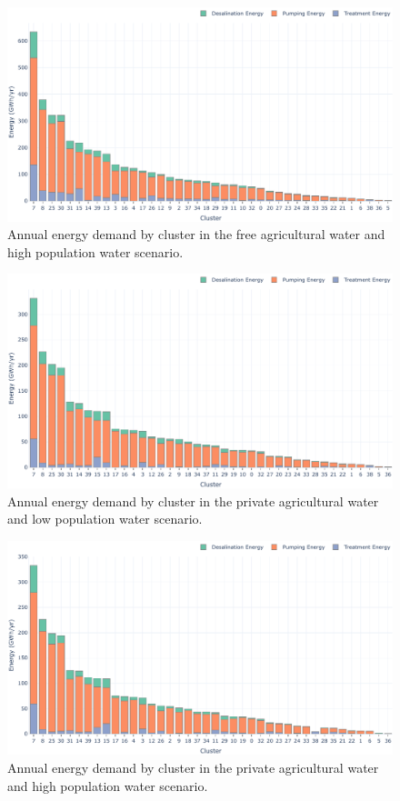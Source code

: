 \documentclass[12pt]{iopart}
\begin{document}
\begin{figure}[!h]
	\centering
	\includegraphics[width=\textwidth]{FreeAgHighPopEnergyPerCluster}
	\caption{Annual energy demand by cluster in the free agricultural water and high population water scenario.}
	\label{fig:FreeAgHighPopEnergyPerCluster}
\end{figure}

\begin{figure}[!h]
	\centering
	\includegraphics[width=\textwidth]{PrivAgLowPopEnergyPerCluster}
	\caption{Annual energy demand by cluster in the private agricultural water and low population water scenario.}
	\label{fig:PrivAgLowPopEnergyPerCluster}
\end{figure}\newpage

\begin{figure}[!h]
	\centering
	\includegraphics[width=\textwidth]{PrivAgHighPopEnergyPerCluster}
	\caption{Annual energy demand by cluster in the private agricultural water and high population water scenario.}
	\label{fig:PrivAgHighPopEnergyPerCluster}
\end{figure}


\newcommand{\newblock}{}


\end{document}
